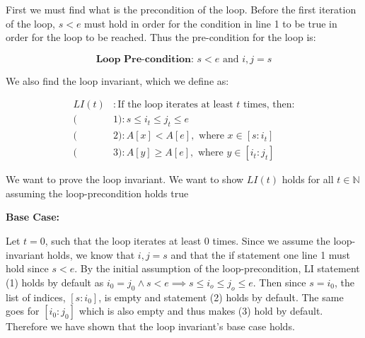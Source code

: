 \documentclass[20pt]{article}
\begin{document}
\noindent
\begin{text}
First we must find what is the precondition of the loop. Before the first iteration of the loop, $s < e$ must hold in order for the condition in line 1 to be true in order for the loop to be reached. Thus the pre-condition for the loop is:
\end{text}
\begin{equation}
    \textbf{Loop Pre-condition: } s < e \text{ and } i, j = s\nonumber
\end{equation}
\noindent
\begin{text}
    We also find the loop invariant, which we define as:
\end{text}
\begin{align}
    LI(t)&: \text{If the loop iterates at least $t$ times, then:}\nonumber\\
    (&1): s \leq i_t \leq j_t \leq e\nonumber\\
    (&2): A[x] < A[e], \text{ where } x \in [s:i_t]\nonumber\\
    (&3): A[y] \geq A[e], \text{ where } y \in [i_t:j_t]\nonumber 
\end{align}
\begin{text}
    We want to prove the loop invariant. We want to show $LI(t)$ holds for all $t \in \mathbb{N}$ assuming the loop-precondition holds true\\
\end{text}

\noindent
\textbf{Base Case: }\\
\begin{text}
    Let $t = 0$, such that the loop iterates at least $0$ times. Since we assume the loop-invariant holds, we know that $i, j = s$ and that the if statement one line 1 must hold since $s < e$. By the initial assumption of the loop-precondition, LI statement (1) holds by default as $i_0 = j_0 \land s < e \implies s \leq i_o \leq j_o \leq e$. Then since $s = i_0$, the list of indices, $[s:i_0]$, is empty and statement (2) holds by default. The same goes for $[i_0:j_0]$ which is also empty and thus makes (3) hold by default. Therefore we have shown that the loop invariant's base case holds.\\
\end{text}
\end{document}
